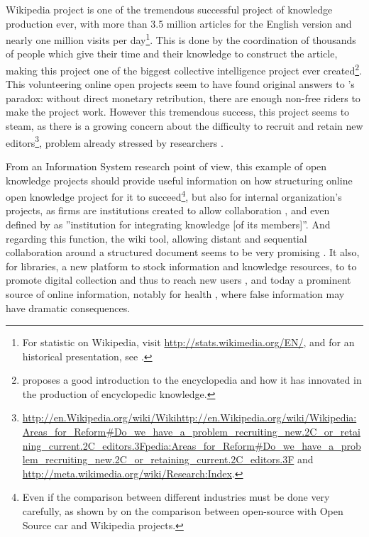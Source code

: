
Wikipedia project is one of the tremendous successful project of knowledge
production ever, with more than 3.5 million articles for the English
version and nearly one million visits per day\footnote{For statistic on Wikipedia, visit \url{http://stats.wikimedia.org/EN/},
and for an historical presentation, see \citet{Lih09}.}. This is done by the coordination of thousands of people which give
their time and their knowledge to construct the article, making this
project one of the biggest collective intelligence project ever created\footnote{\citet{Olleros08} proposes a good introduction to the encyclopedia
and how it has innovated in the production of encyclopedic knowledge.}. This volunteering online open projects seem to have found original
answers to \citet{Olson65}'s paradox: without direct monetary retribution,
there are enough non-free riders to make the project work. However
this tremendous success, this project seems to steam, as there is
a growing concern about the difficulty to recruit and retain new editors\footnote{\url{http://en.Wikipedia.org/wiki/Wikihttp://en.Wikipedia.org/wiki/Wikipedia:Areas_for_Reform#Do_we_have_a_problem_recruiting_new.2C_or_retaining_current.2C_editors.3Fpedia:Areas_for_Reform#Do_we_have_a_problem_recruiting_new.2C_or_retaining_current.2C_editors.3F}
and \url{http://meta.wikimedia.org/wiki/Research:Index}.}, problem already stressed by researchers \citep{Ortega09}.

From an Information System research point of view, this example of
open knowledge projects should provide useful information on how structuring
online open knowledge project for it to succeed\footnote{Even if the comparison between different industries must be done very
carefully, as shown by \citet{MullerSeitzReger09} on the comparison
between open-source with Open Source car and Wikipedia projects.}, but also for internal organization's projects, as firms are institutions
created to allow collaboration \citep{Simon57,MarchSimon58}, and
even defined by \citet{Grant96} as ''institution for
integrating knowledge {[}of its members{]}''. And regarding this
function, the wiki tool, allowing distant and sequential collaboration
around a structured document seems to be very promising \citep{HasanPfaff06a,HasanPfaff06b,HasanPfaff06c}.
It also, for libraries, a new platform to stock information and knowledge
resources, to to promote digital collection and thus to reach new
users \citep{PressleyMcCallum08}, and today a prominent source of
online information, notably for health \citep{LaurentVickers09},
where false information may have dramatic consequences. 

